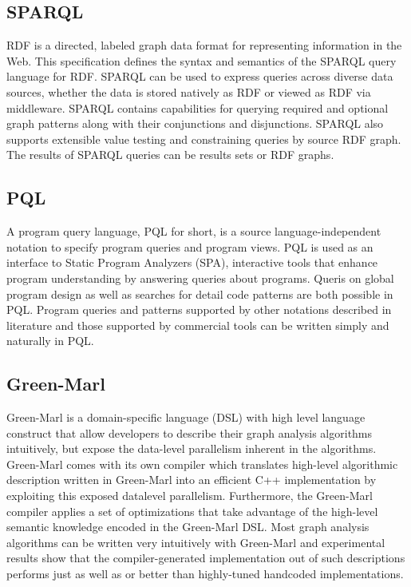 \documentclass[11pt,singlecolumn]{scrartcl}
\begin{document}
\subsection{SPARQL}
RDF is a directed, labeled graph data format for representing information in the Web. This specification defines the syntax and semantics of the SPARQL query language for RDF. SPARQL can be used to express queries across diverse data sources, whether the data is stored natively as RDF or viewed as RDF via middleware. SPARQL contains capabilities for querying required and optional graph patterns along with their conjunctions and disjunctions. SPARQL also supports extensible value testing and constraining queries by source RDF graph. The results of SPARQL queries can be results sets or RDF graphs.\cite{SPARQL}
\subsection{PQL}
A program query language, PQL for short, is a source language-independent notation to specify program queries and program views. PQL is used as an interface to Static Program Analyzers (SPA), interactive tools that enhance program understanding by answering queries about programs. Queris on global program design as well as searches for detail code patterns are both possible in PQL. Program queries and patterns supported by other notations described in literature and those supported by commercial tools can be written simply and naturally in PQL.\cite {PQL}



\subsection{Green-Marl}
Green-Marl is a domain-specific language (DSL) with high level language construct that allow developers to describe their graph analysis algorithms intuitively, but expose the data-level parallelism inherent in the algorithms. Green-Marl comes with its own compiler which translates high-level algorithmic description written in Green-Marl into an efficient C++ implementation by exploiting this exposed datalevel parallelism. Furthermore, the Green-Marl compiler applies a set of optimizations that take advantage of the high-level semantic knowledge encoded in the Green-Marl DSL. Most graph analysis algorithms can be written very intuitively with Green-Marl and experimental results show that the compiler-generated implementation out of such descriptions performs just as well as or better than highly-tuned handcoded implementations.\cite {Greenmarl}
\end{document}
